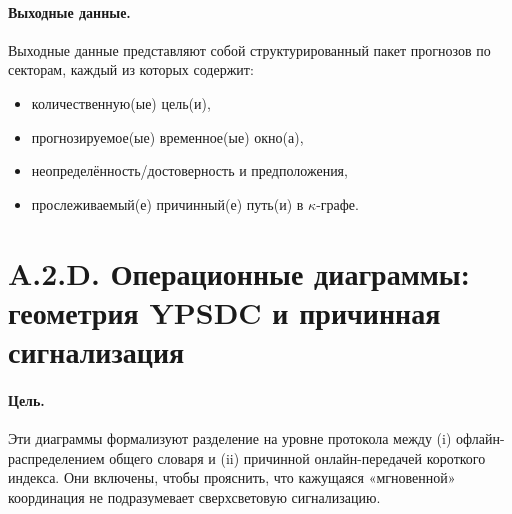 \documentclass[11pt,a4paper]{article}
\begin{document}
	\paragraph{Выходные данные.}
	Выходные данные представляют собой структурированный пакет прогнозов по секторам, каждый из которых содержит:
	\begin{itemize}[leftmargin=*]
		\item количественную(ые) цель(и),
		\item прогнозируемое(ые) временное(ые) окно(а),
		\item неопределённость/достоверность и предположения,
		\item прослеживаемый(е) причинный(е) путь(и) в $\kappa$-графе.
	\end{itemize}
	
	\section*{A.2.D. Операционные диаграммы: геометрия YPSDC и причинная сигнализация}
	
	\paragraph{Цель.}
	Эти диаграммы формализуют разделение на уровне протокола между (i) офлайн-распределением общего словаря и (ii) причинной онлайн-передачей короткого индекса. Они включены, чтобы прояснить, что кажущаяся «мгновенной» координация не подразумевает сверхсветовую сигнализацию.
	
\end{document}
